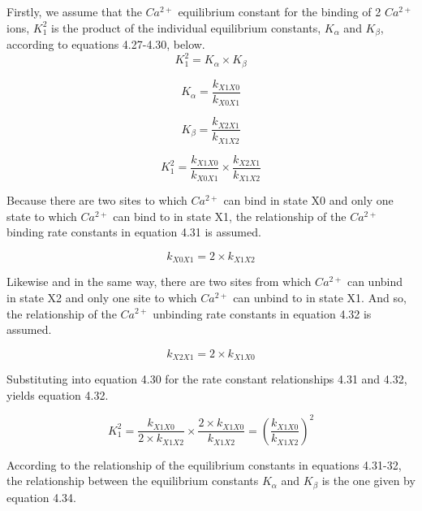\documentclass[12pt]{ucsddissertation}
\begin{document}
Firstly, we assume that the $Ca^{2+}$  equilibrium constant for the binding of 2 $Ca^{2+}$ ions, $K_{1}^{2}$ is the product of the individual equilibrium constants, $K_{\alpha}$ and $K_{\beta}$, according to equations 4.27-4.30, below. 
\begin{equation}
K_{1}^{2}= K_{\alpha} \times K_{\beta}
\end{equation}

\begin{equation}
K_{\alpha} = \frac{k_{X1X0}}{k_{X0X1}} 
\end{equation}

\begin{equation}
K_{\beta} = \frac{k_{X2X1}}{k_{X1X2}}
\end{equation}

\begin{equation}
K^{2}_{1}=  \frac{k_{X1X0}}{k_{X0X1}} \times \frac{k_{X2X1}}{k_{X1X2}}
\end{equation}

Because there are two sites to which  $Ca^{2+}$ can bind in state X0 and only one state to which  $Ca^{2+}$ can bind to in state X1, the relationship of the $Ca^{2+}$ binding rate constants in equation 4.31 is assumed. 

\begin{equation}
k_{X0X1}=2 \times k_{X1X2} 
\end{equation}

Likewise and in the same way, there are two sites from which  $Ca^{2+}$ can unbind in state X2 and only one site to which $Ca^{2+}$ can unbind to in state X1. And so, the relationship of the $Ca^{2+}$ unbinding rate constants in equation 4.32 is assumed. 

\begin{equation}
k_{X2X1}=2 \times k_{X1X0} 
\end{equation} 

Substituting into equation 4.30 for the rate constant relationships 4.31 and 4.32, yields equation 4.32.

\begin{equation}
K^{2}_{1}=  \frac{k_{X1X0}}{2 \times k_{X1X2}} \times \frac{2 \times k_{X1X0}}{k_{X1X2}} = \left(\frac{k_{X1X0}}{k_{X1X2}}\right)^{2}
\end{equation}

According to the relationship of the equilibrium constants in equations 4.31-32, the relationship between the equilibrium constants $K_{\alpha}$ and $K_{\beta}$ is the one given by equation 4.34.
\end{document}
